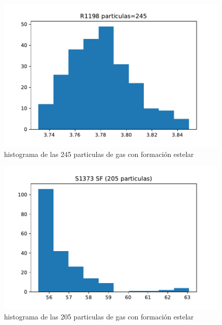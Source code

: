 \begin{figure}[h]
\centering
\includegraphics[width=18cm]{Figures/R1198_SFhist.pdf}
\decoRule
\caption[R1198 SF distribucion]{histograma de las 245 particulas de gas con formaci\'on estelar}
\label{fig:Electron}
\end{figure}

\begin{figure}[h]
\centering
\includegraphics[width=18cm]{Figures/S1373_SFhist.pdf}
\decoRule
\caption[S1373 SF distribucion]{histograma de las 205 particulas de gas con formaci\'on estelar}
\label{fig:Electron}
\end{figure}
